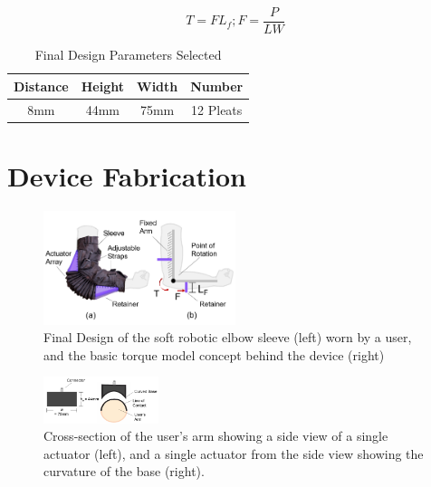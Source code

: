 \documentclass[letterpaper, 10 pt, conference]{ieeeconf}  %
\begin{document}
\begin{equation}\label{eq. X16}
	T = F L_f      ;     F = \frac{P}{LW} 
\end{equation}

\begin{table}[h]
\caption{Final Design Parameters Selected
}
\label{Functional Requirements}
\begin{center}
\renewcommand{\arraystretch}{1.5} %
\begin{tabular}{| c | c | c | c |}
\hline
\textbf{Distance} & \textbf{Height}  & \textbf{Width} & \textbf{Number}\\ 

\hline

8mm &  44mm  & 75mm & 12 Pleats\\ 

\hline

\end{tabular}
\end{center}
\end{table}

\section{Device Fabrication}

\begin{figure}[t!]
\centering
\includegraphics[width=0.5\textwidth]{arm.PNG}
\caption{Final Design of the soft robotic elbow sleeve (left) worn by a user, and the basic torque model concept behind the device (right)}
\label{fig:stifftest}
\end{figure}

\begin{figure}[t!]
\centering
\includegraphics[width=0.3\textwidth]{bladders.PNG}
\caption{Cross-section of the user’s arm showing a side view of a single actuator (left), and a single actuator from the side view showing the curvature of the base (right).}
\label{fig:stifftest}
\end{figure}
\end{document}

